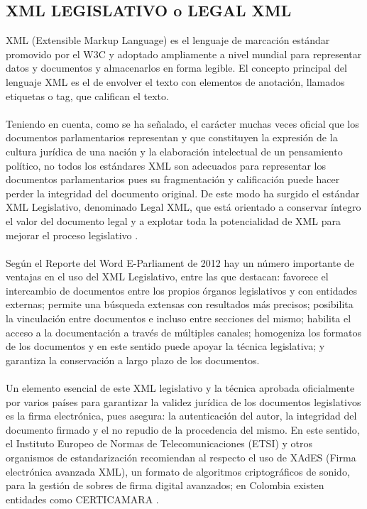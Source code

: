 \documentclass[conference]{IEEEtran}\usepackage[]{graphicx}\usepackage[]{color}
\begin{document}
\subsection{XML LEGISLATIVO o LEGAL XML}  
XML (Extensible Markup Language) es el lenguaje de marcación estándar promovido por el W3C y adoptado ampliamente a nivel mundial para representar datos y documentos y almacenarlos en forma legible. El concepto principal del lenguaje XML es el de envolver el texto con elementos de anotación, llamados etiquetas o tag, que califican el texto. \\ \\
Teniendo en cuenta, como se ha señalado, el carácter muchas veces oficial que los documentos parlamentarios representan y que constituyen la expresión de la cultura jurídica de una nación y la elaboración intelectual de un pensamiento político, no todos los estándares XML son adecuados para representar los documentos parlamentarios pues su fragmentación y calificación puede hacer perder la integridad del documento original. De este modo ha surgido el estándar XML Legislativo, denominado Legal XML, que está orientado a conservar íntegro el valor del documento legal y a explotar toda la potencialidad de XML para mejorar el proceso legislativo \cite{biblio1}. \\ \\
Según el Reporte del Word E-Parliament de 2012 hay un número importante de ventajas en el uso del XML Legislativo, entre las que destacan: favorece el intercambio de documentos entre los propios órganos legislativos y con entidades externas; permite una búsqueda extensas con resultados más precisos; posibilita la vinculación entre documentos e incluso entre secciones del mismo; habilita el acceso a la documentación a través de múltiples canales; homogeniza los formatos de los documentos y en este sentido puede apoyar la técnica legislativa; y garantiza la conservación a largo plazo de los documentos. \\ \\
Un elemento esencial de este XML legislativo y la técnica aprobada oficialmente por varios países para garantizar la validez jurídica de los documentos legislativos es la firma electrónica, pues asegura: la autenticación del autor, la integridad del documento firmado y el no repudio de la procedencia del mismo. En este sentido, el Instituto Europeo de Normas de Telecomunicaciones (ETSI) y otros organismos de estandarización recomiendan al respecto el uso de XAdES (Firma electrónica avanzada XML), un formato de algoritmos criptográficos de sonido, para la gestión de sobres de firma digital avanzados; en Colombia existen entidades como CERTICAMARA \cite{biblio8}. 
\end{document}
